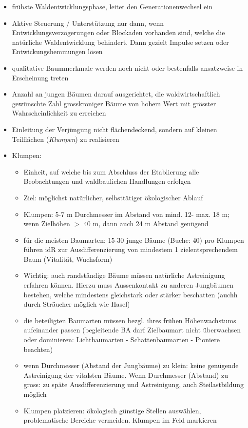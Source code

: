 \documentclass{article}
\begin{document}
\begin{itemize}

  \item frühste Waldentwicklungsphase, leitet den Generationenwechsel ein
  
  \item Aktive Steuerung / Unterstützung nur dann, wenn Entwicklungsverzögerungen oder Blockaden vorhanden sind, welche die natürliche Waldentwicklung behindert. Dann gezielt Impulse setzen oder Entwickungshemmungen lösen
  
  \item qualitative Baummerkmale werden noch nicht oder bestenfalls ansatzweise in Erscheinung treten
  
  \item Anzahl an jungen Bäumen darauf ausgerichtet, die waldwirtschaftlich gewünschte Zahl grosskroniger Bäume von hohem Wert mit grösster Wahrscheinlichkeit zu erreichen
  
  \item Einleitung der Verjüngung nicht flächendeckend, sondern auf kleinen Teilflächen (\textit{Klumpen}) zu realisieren
  
  \item Klumpen:
  
    \begin{itemize}
      \item Einheit, auf welche bis zum Abschluss der Etablierung alle Beobachtungen und waldbaulichen Handlungen erfolgen
      \item Ziel: möglichst natürlicher, selbsttätiger ökologischer Ablauf
      \item Klumpen: 5-7 m Durchmesser im Abstand von mind. 12- max. 18 m; wenn Zielhöhen $>$ 40 m, dann auch 24 m Abstand genügend 
  	  \item für die meisten Baumarten: 15-30 junge Bäume (Buche: 40) pro Klumpen führen idR zur Ausdifferenzierung von mindestem 1 zielentsprechendem Baum (Vitalität, Wuchsform)
  	  \item Wichtig: auch randständige Bäume müssen natürliche Astreinigung erfahren können. Hierzu muss Aussenkontakt zu anderen Jungbäumen bestehen, welche mindestens gleichstark oder stärker beschatten (auchh durch Sträucher möglich wie Hasel)
  	  \item die beteiligten Baumarten müssen bezgl. ihres frühen Höhenwachstums aufeinander passen (begleitende BA darf Zielbaumart nicht überwachsen oder dominieren: Lichtbaumarten - Schattenbaumarten - Pioniere beachten)
  	  \item wenn Durchmesser (Abstand der Jungbäume) zu klein: keine genügende Astreinigung der vitalsten Bäume. Wenn Durchmesser (Abstand) zu gross: zu späte Ausdifferenzierung und Astreinigung, auch Steilastbildung möglich 
  	  \item Klumpen platzieren: ökologisch günstige Stellen auswählen, problematische Bereiche vermeiden. Klumpen im Feld markieren
    \end{itemize}
  

\end{itemize}
\end{document}
